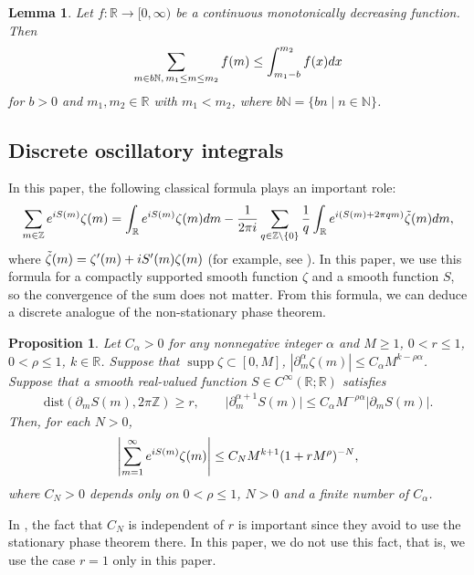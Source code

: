\documentclass[10pt,a4paper]{article}
\numberwithin{equation}{section}
\newtheorem{Lemma}[Theorem]{Lemma}
\newtheorem{Proposition}[Theorem]{Proposition}
 { \theoremstyle{definition}
\newtheorem{Definition}[Theorem]{Definition}
\newtheorem{Note}[Theorem]{Note}
\newtheorem{Example}[Theorem]{Example}
\newtheorem{Remark}[Theorem]{Remark} }
\def\R{\mathbb{R}}%
\DeclareMathOperator{\supp}{supp}%
\def\a{\alpha}
\def\z{\zeta}
\def\pa{\partial}
\begin{document}
\begin{Lemma}\label{monotonesum}
Let $f\colon\R\to [0,\infty)$ be a continuous monotonically decreasing function. Then
\begin{align*}
\sum_{m\in b\mathbb{N},\, m_1\leq m\leq m_2}f(m)\leq \int_{m_1-b}^{m_2}f(x){\rm d}x
\end{align*}
for $b>0$ and $m_1,m_2\in \mathbb{R}$ with $m_1<m_2$, where $b\mathbb{N}=\{b n\mid n\in \mathbb{N}\}$.
\end{Lemma}

\subsection{Discrete oscillatory integrals}

In this paper, the following classical formula plays an important role:
\begin{align}\label{discon}
\sum_{m\in\mathbb{Z}}{\rm e}^{{\rm i}S(m)}\z(m)=\int_{\R}{\rm e}^{{\rm i}S(m)}\z(m){\rm d}m-\frac{1}{2\pi {\rm i}}\sum_{q\in\mathbb{Z}\setminus \{0\}}\frac{1}{q}\int_{\R}{\rm e}^{{\rm i}(S(m)+2\pi qm)}\tilde{\z}(m) {\rm d}m,
\end{align}
where $\tilde{\z}(m)=\z'(m)+{\rm i}S'(m)\z(m)$ (for example, see \cite[Proof of Lemma 5.3]{IJ}). In this paper, we use this formula for a compactly supported smooth function $\z$ and a smooth function $S$, so the convergence of the sum does not matter.
 From this formula, we can deduce a discrete analogue of the non-stationary phase theorem.

\begin{Proposition}\label{discsum1}
Let $C_{\a}>0$ for any nonnegative integer $\a$ and $M\geq 1$, $0<r\leq 1$, $0<\rho\leq 1$, $k\in \R$.
Suppose that
$
\supp \z\subset [0,M]$, $ |\pa_m^{\a}\z(m)|\leq C_{\a}M^{k-\rho\a}$.
Suppose that a smooth real-valued function $S\in C^{\infty}(\R;\R)$ satisfies
\begin{align*}
\mathrm{dist}(\pa_mS(m), 2\pi\mathbb{Z})\geq r,\qquad \big|\pa_m^{\a+1}S(m)\big|\leq C_{\a}M^{-\rho\a}|\pa_mS(m)|.
\end{align*}
Then, for each $N>0$,
\begin{align*}
\left|\sum_{m=1}^{\infty}{\rm e}^{{\rm i}S(m)}\z(m)\right|\leq C_NM^{k+1}(1+r M^{\rho})^{-N},
\end{align*}
where $C_N>0$ depends only on $0<\rho\leq 1$, $N>0$ and a finite number of $C_{\a}$.
\end{Proposition}

\begin{Remark}
In \cite{IJ}, the fact that $C_N$ is independent of $r$ is important since they avoid to use the stationary phase theorem there. In this paper, we do not use this fact, that is, we use the case $r=1$ only in this paper.
\end{Remark}
\end{document}
